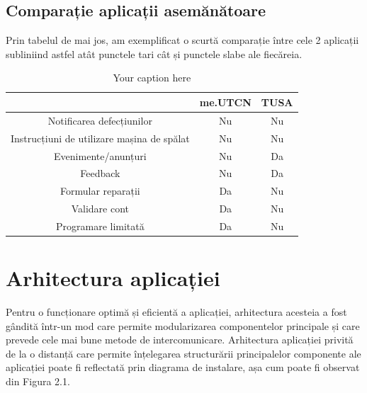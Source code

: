 \documentclass[12pt,a4paper]{report}
\theoremstyle{definition}
\theoremstyle{remark}
\begin{document}
\vspace{15mm}

\section{Comparație aplicații asemănătoare}
\par Prin tabelul de mai jos, am exemplificat o scurtă comparație între cele 2 aplicații subliniind astfel atât punctele tari cât și punctele slabe ale fiecăreia.

\begin{table}[H]
    \centering
    \begin{tabular}{|c|c|c|}
        \hline
        & \textbf{me.UTCN} & \textbf{TUSA} \\ \hline
        Notificarea defecțiunilor                      & Nu               & Nu            \\ \hline
        Instrucțiuni de utilizare mașina de spălat     & Nu               & Nu            \\ \hline
        Evenimente/anunțuri                            & Nu               & Da            \\ \hline
        Feedback                                       & Nu               & Da            \\ \hline
        Formular reparații                             & Da               & Nu            \\ \hline
        Validare cont                                  & Da               & Nu            \\ \hline
        Programare limitată                            & Da               & Nu            \\ \hline
    \end{tabular}
    \caption{Your caption here} %
    \label{your-label-here}
\end{table}

\chapter{Arhitectura aplicației}
\par Pentru o funcționare optimă și eficientă a aplicației, arhitectura acesteia a fost gândită într-un mod care permite modularizarea componentelor principale și care prevede cele mai bune metode de intercomunicare. Arhitectura aplicației privită de la o distanță care permite înțelegarea structurării principalelor componente ale aplicației poate fi reflectată prin diagrama de instalare, așa cum poate fi observat din Figura 2.1.
\end{document}
